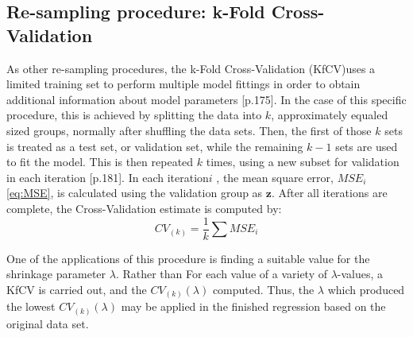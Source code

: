 \documentclass[%
oneside,                 %
final,                   %
10pt]{article}
\begin{document}
\subsection{Re-sampling procedure: k-Fold Cross-Validation}
As other re-sampling procedures, the k-Fold Cross-Validation (KfCV)uses a limited training set to perform multiple model fittings in order to obtain additional information about model parameters \citep{2017introstatlearn}[p.175]. In the case of this specific procedure, this is achieved by splitting the data into $k$, approximately equaled sized groups, normally after shuffling the data sets. Then, the first of those $k$ sets is treated as a test set, or validation set, while the remaining $k-1$ sets are used to fit the model. This is then repeated $k$ times, using a new subset for validation in each iteration \citep{2017introstatlearn}[p.181]. In each iteration$ i$ , the mean square error, $MSE_i$ \eqref{eq:MSE}, is calculated using the validation group as $\bm{z}$. After all iterations are complete, the Cross-Validation estimate is computed by:
\begin{equation}
CV_(k)=\frac{1}{k}\sum MSE_i
\end{equation}

One of the applications of this procedure is finding a suitable value for the shrinkage parameter $\lambda$. Rather than For each value of a variety of $\lambda$-values, a KfCV is carried out, and the $CV_(k)(\lambda)$ computed. Thus, the $\lambda$ which produced the lowest $CV_(k)(\lambda)$ may be applied in the finished regression based on the original data set.
\end{document}
